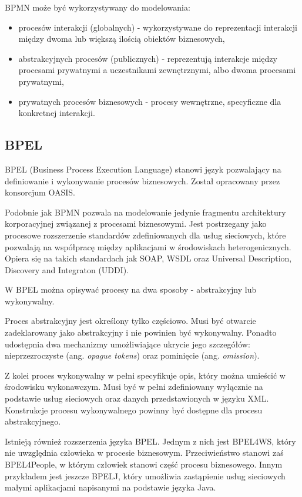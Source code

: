 BPMN może być wykorzystywany do modelowania:
\begin{itemize}
\item{procesów interakcji (globalnych) - wykorzystywane do reprezentacji interakcji między dwoma lub większą ilością obiektów biznesowych,}
\item{abstrakcyjnych procesów (publicznych) - reprezentują interakcje między procesami prywatnymi a uczestnikami zewnętrznymi, albo dwoma procesami prywatnymi,}
\item{prywatnych procesów biznesowych - procesy wewnętrzne, specyficzne dla konkretnej interakcji.}
\end{itemize}

\subsection{BPEL}
BPEL (Business Process Execution Language) stanowi język pozwalający na definiowanie i wykonywanie procesów biznesowych. Został opracowany przez konsorcjum OASIS.

Podobnie jak BPMN pozwala na modelowanie jedynie fragmentu architektury korporacyjnej związanej z procesami biznesowymi. Jest postrzegany jako procesowe rozszerzenie standardów zdefiniowanych dla usług sieciowych, które pozwalają na współpracę między aplikacjami w środowiskach heterogenicznych. Opiera się na takich standardach jak SOAP, WSDL oraz Universal Description, Discovery and Integraton (UDDI). 

W BPEL można opisywać procesy na dwa sposoby - abstrakcyjny lub wykonywalny.

Proces abstrakcyjny jest określony tylko częściowo. Musi być otwarcie zadeklarowany jako abstrakcyjny i nie powinien być wykonywalny. Ponadto  udostępnia dwa mechanizmy umożliwiające ukrycie jego szczegółów: nieprzezroczyste (ang. \emph{opague tokens}) oraz pominięcie (ang. \emph{omission}).

Z kolei proces wykonywalny w pełni specyfikuje opis, który można umieścić w środowisku wykonawczym. Musi być w pełni zdefiniowany wyłącznie na podstawie usług sieciowych oraz danych przedstawionych w języku XML. Konstrukcje procesu wykonywalnego powinny być dostępne dla procesu abstrakcyjnego. 

Istnieją również rozszerzenia języka BPEL. Jednym z nich jest BPEL4WS, który nie uwzględnia człowieka w procesie biznesowym. Przeciwieństwo stanowi zaś BPEL4People, w którym człowiek stanowi część procesu biznesowego. Innym przykładem jest jeszcze BPELJ, który umożliwia zastąpienie usług sieciowych małymi aplikacjami napisanymi na podstawie języka Java. \cite{PlatIntGor}

